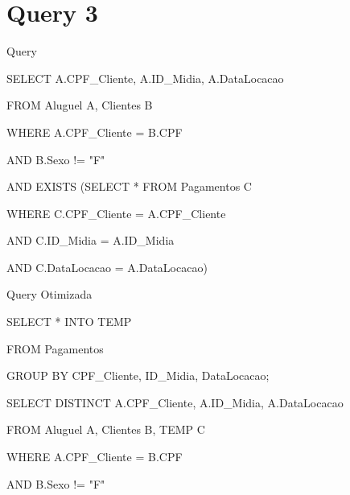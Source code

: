 \documentclass[aspectratio=169]{beamer}
\begin{document}
    \section{Query 3}

    \begin{frame}{Query}

        SELECT A.CPF\_Cliente, A.ID\_Midia, A.DataLocacao

        FROM Aluguel A, Clientes B

        WHERE A.CPF\_Cliente = B.CPF

        AND B.Sexo != "F"

        AND EXISTS (SELECT * FROM Pagamentos C

        WHERE C.CPF\_Cliente = A.CPF\_Cliente

        AND C.ID\_Midia = A.ID\_Midia

        AND C.DataLocacao = A.DataLocacao)

    \end{frame}

    \begin{frame}{Query Otimizada}

        SELECT * INTO TEMP
        
        FROM Pagamentos 

        GROUP BY CPF\_Cliente, ID\_Midia, DataLocacao;

        SELECT DISTINCT A.CPF\_Cliente, A.ID\_Midia, A.DataLocacao

        FROM Aluguel A, Clientes B, TEMP C

        WHERE A.CPF\_Cliente = B.CPF

        AND B.Sexo != "F"

    \end{frame}

\end{document}
